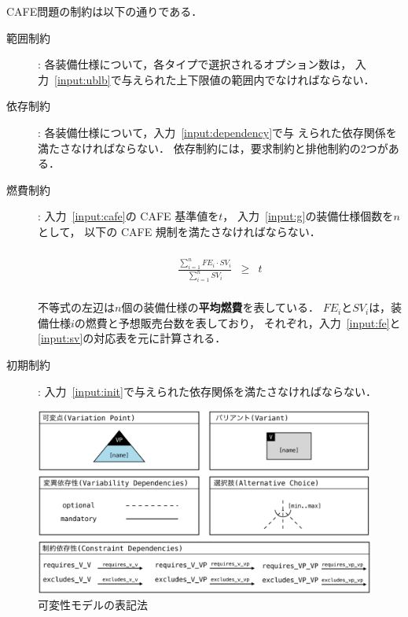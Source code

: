 CAFE問題の制約は以下の通りである．
\begin{description}
\item[範囲制約]: 各装備仕様について，各タイプで選択されるオプション数は，
  入力~\ref{input:ublb}で与えられた上下限値の範囲内でなければならない．
\item[依存制約]: 各装備仕様について，入力~\ref{input:dependency}で与
  えられた依存関係を満たさなければならない．
  依存制約には，要求制約と排他制約の2つがある．
\item[燃費制約]: 入力~\ref{input:cafe}の CAFE 基準値を$t$，
  入力~\ref{input:g}の装備仕様個数を$n$として，
  以下の CAFE 規制を満たさなければならない．
  \begin{adjustvboxheight}
  \[
    \begin{array}{lcr}
      & & \\
      \displaystyle\frac{\sum_{i=1}^{n} FE_{i}\cdot SV_{i}}{\sum_{i=1}^{n} SV_{i}}
      &
        \geq 
      &
        t \\
      & & 
    \end{array}
  \]
  \end{adjustvboxheight}
  不等式の左辺は$n$個の装備仕様の\textbf{平均燃費}を表している．
  $FE_{i}$と$SV_{i}$は，装備仕様$i$の燃費と予想販売台数を表しており，
  それぞれ，入力~\ref{input:fe}と\ref{input:sv}の対応表を元に計算される．
\item[初期制約]:
  入力~\ref{input:init}で与えられた依存関係を満たさなければならない．
\end{description}

\begin{figure}[tb]
  \centering
  \includegraphics[width=\linewidth]{images/notation.eps}
  \caption{可変性モデルの表記法\cite{Pohl05:sple}}
  \label{fig:ovm_notation}
\end{figure}

